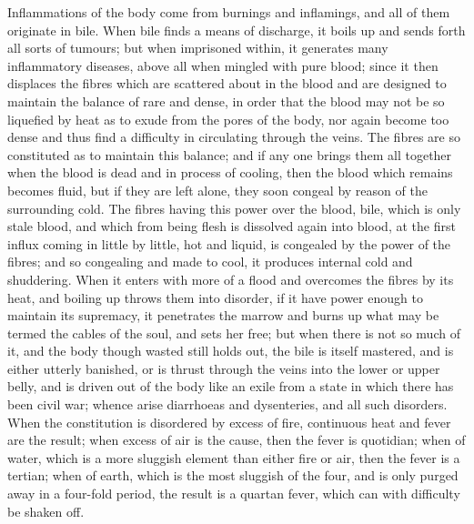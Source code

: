 \documentclass[11pt,letter]{article}
\begin{document}
\par  Inflammations of the body come from burnings and inflamings, and all of them originate in bile. When bile finds a means of discharge, it boils up and sends forth all sorts of tumours; but when imprisoned within, it generates many inflammatory diseases, above all when mingled with pure blood; since it then displaces the fibres which are scattered about in the blood and are designed to maintain the balance of rare and dense, in order that the blood may not be so liquefied by heat as to exude from the pores of the body, nor again become too dense and thus find a difficulty in circulating through the veins. The fibres are so constituted as to maintain this balance; and if any one brings them all together when the blood is dead and in process of cooling, then the blood which remains becomes fluid, but if they are left alone, they soon congeal by reason of the surrounding cold. The fibres having this power over the blood, bile, which is only stale blood, and which from being flesh is dissolved again into blood, at the first influx coming in little by little, hot and liquid, is congealed by the power of the fibres; and so congealing and made to cool, it produces internal cold and shuddering. When it enters with more of a flood and overcomes the fibres by its heat, and boiling up throws them into disorder, if it have power enough to maintain its supremacy, it penetrates the marrow and burns up what may be termed the cables of the soul, and sets her free; but when there is not so much of it, and the body though wasted still holds out, the bile is itself mastered, and is either utterly banished, or is thrust through the veins into the lower or upper belly, and is driven out of the body like an exile from a state in which there has been civil war; whence arise diarrhoeas and dysenteries, and all such disorders. When the constitution is disordered by excess of fire, continuous heat and fever are the result; when excess of air is the cause, then the fever is quotidian; when of water, which is a more sluggish element than either fire or air, then the fever is a tertian; when of earth, which is the most sluggish of the four, and is only purged away in a four-fold period, the result is a quartan fever, which can with difficulty be shaken off.
\end{document}
